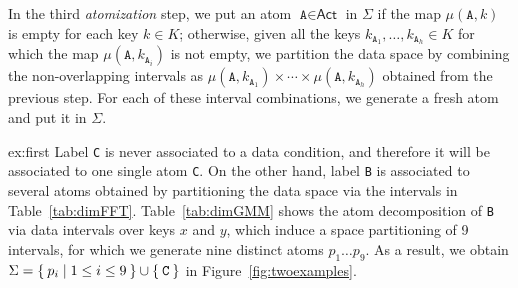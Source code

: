 In the third \textit{atomization} step, we put an atom $\texttt{A}\in\textsf{Act}$ in $\Sigma$ if the map $\mu(\texttt{A},k)$ is empty for each key $k\in K$; otherwise, given all the keys $k_{\texttt{A}_1},\dots,k_{\texttt{A}_h}\in K$ for which the map $\mu(\texttt{A},k_{\texttt{A}_i})$ is not empty, we partition the data space by combining the non-overlapping intervals as $\mu(\texttt{A},k_{\texttt{A}_1})\times\cdots\times\mu(\texttt{A},k_{\texttt{A}_h})$ obtained from the previous step. For each of these interval combinations, we generate a fresh atom and put it in $\Sigma$.
\begin{continueexample}{ex:first}
Label \texttt{C} is never associated to a data condition, and therefore it will be associated to one single atom \texttt{C}. On the other hand, label \texttt{B} is associated to several atoms obtained by partitioning the data space via the intervals in Table~\ref{tab:dimFFT}. Table~\ref{tab:dimGMM} shows the atom decomposition of \texttt{B} via data intervals over keys $x$ and $y$, which induce a space partitioning of 9 intervals, for which we generate nine distinct atoms $p_1\dots p_9$. As a result, we obtain $\Sigma=\Set{p_i|1\leq i\leq 9}\cup\Set{\texttt{C}}$ in Figure~\ref{fig:twoexamples}.
\end{continueexample}





